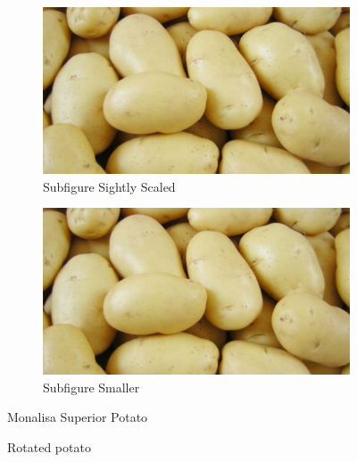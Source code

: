 \documentclass[../../../../main.tex]{subfiles}
\begin{document}
\begin{figure}[!htbp]
    \centering
    \begin{subfigure}{0.60\textwidth}
        \includegraphics[width=\textwidth]{./figures/potato_monalisa_superior.jpg}
        \caption{Subfigure Sightly Scaled}
    \end{subfigure}
    \hfill
    \begin{subfigure}{0.35\textwidth}
        \includegraphics[width=\textwidth]{./figures/potato_monalisa_superior.jpg}
        \caption{Subfigure Smaller}
    \end{subfigure}
    \caption{Monalisa Superior Potato}
\end{figure}



\begin{figure}[!htbp]
    \centering
    \caption{Rotated potato}
\end{figure}
\end{document}
